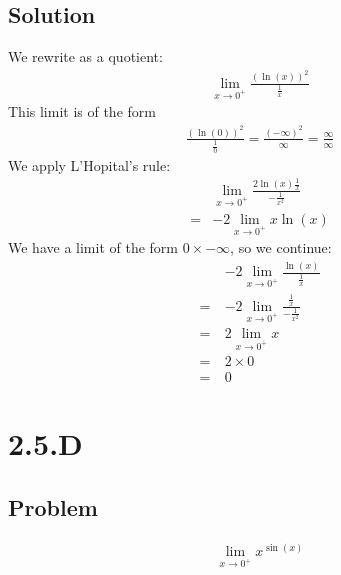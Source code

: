 \documentclass[12pt]{article}
\begin{document}
\subsection*{Solution}
We rewrite as a quotient:
\begin{align*}
    \lim_{x \to 0^+} \frac{(\ln(x))^2}{\frac{1}{x}}
\end{align*}
This limit is of the form
\begin{align*}
    \frac{(\ln(0))^2}{\frac{1}{0}} = \frac{(-\infty)^2}{\infty} = \frac{\infty}{\infty}
\end{align*}
We apply L'Hopital's rule:
\begin{align*}
     & \lim_{x \to 0^+} \frac{2 \ln(x) \frac{1}{x}}{-\frac{1}{x^2}} \\
    =& -2 \lim_{x \to 0^+} x \ln(x)
\end{align*}
We have a limit of the form $0 \times -\infty$, so we continue:
\begin{align*}
       & -2 \lim_{x \to 0^+} \frac{\ln(x)}{\frac{1}{x}} \\
    =\ & -2 \lim_{x \to 0^+} \frac{\frac{1}{x}}{-\frac{1}{x^2}} \\
    =\ & 2 \lim_{x \to 0^+} x \\
    =\ & 2 \times 0 \\
    =\ & 0
\end{align*}



\section*{2.5.D}

\subsection*{Problem}
\begin{align*}
    \lim_{x \to 0^+} x^{\sin(x)}
\end{align*}
\end{document}
